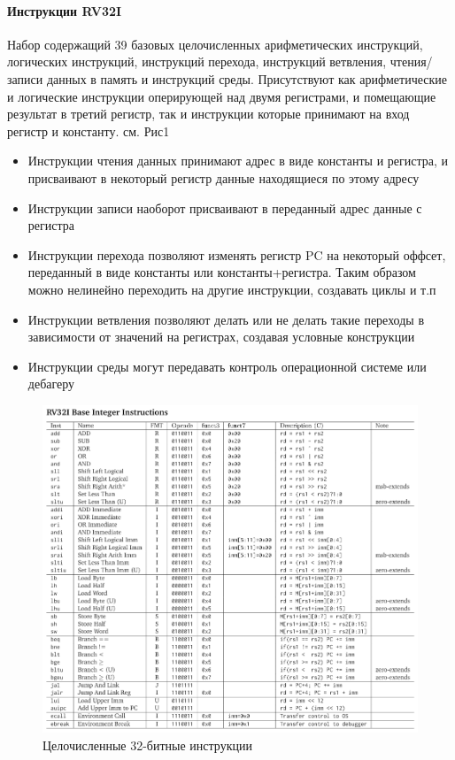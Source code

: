 \documentclass{article}
\begin{document}
\paragraph{Инструкции RV32I}
Набор содержащий 39 базовых целочисленных арифметических инструкций, логических инструкций, инструкций перехода, инструкций ветвления, чтения/записи данных в память и инструкций среды. Присутствуют как арифметические и логические инструкции оперирующей над двумя регистрами, и помещающие результат в третий регистр, так и инструкции которые принимают на вход регистр и константу. см. Рис1\\ 
\begin{itemize}
	\item{Инструкции чтения данных принимают адрес в виде константы и регистра, и присваивают в некоторый регистр данные находящиеся по этому адресу}
	\item{Инструкции записи наоборот присваивают в переданный адрес данные с регистра}
	\item{Инструкции перехода позволяют изменять регистр PC на некоторый оффсет, переданный в виде константы или константы+регистра. Таким образом можно нелинейно переходить на другие инструкции, создавать циклы и т.п}
	\item{Инструкции ветвления позволяют делать или не делать такие переходы в зависимости от значений на регистрах, создавая условные конструкции}
	\item{Инструкции среды могут передавать контроль операционной системе или дебагеру}
\end{itemize}
\begin{figure}[H]
		\includegraphics[width=1\textwidth]{pictures/rv32i}
		\caption{Целочисленные 32-битные инструкции}
\end{figure}
\end{document}

